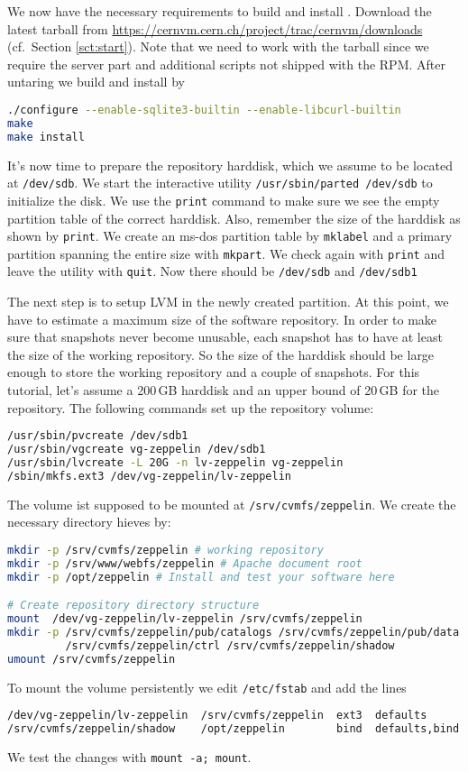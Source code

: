 We now have the necessary requirements to build and install \cvmfs.
Download the latest tarball from \url{https://cernvm.cern.ch/project/trac/cernvm/downloads} (cf.~Section \ref{sct:start}).
Note that we need to work with the tarball since we require the server part and additional scripts not shipped with the RPM.
After untaring we build and install by
\begin{lstlisting}[language=bash]
./configure --enable-sqlite3-builtin --enable-libcurl-builtin
make
make install
\end{lstlisting}

It's now time to prepare the repository harddisk, which we assume to be located at \texttt{/dev/sdb}.
We start the interactive utility \lstinline{/usr/sbin/parted /dev/sdb} to initialize the disk.
We use the \lstinline{print} command to make sure we see the empty partition table of the correct harddisk.
Also, remember the size of the harddisk as shown by \lstinline{print}.
We create an ms-dos partition table by \lstinline{mklabel} and a primary partition spanning the entire size with \lstinline{mkpart}.
We check again with \lstinline{print} and leave the utility with \lstinline{quit}.
Now there should be \texttt{/dev/sdb} and \texttt{/dev/sdb1}

The next step is to setup LVM in the newly created partition.
At this point, we have to estimate a maximum size of the software repository.
In order to make sure that snapshots never become unusable, each snapshot has to have at least the size of the working repository.
So the size of the harddisk should be large enough to store the working repository and a couple of snapshots.
For this tutorial, let's assume a 200\,GB harddisk and an upper bound of 20\,GB for the repository.
The following commands set up the repository volume:
\begin{lstlisting}[language=bash]
/usr/sbin/pvcreate /dev/sdb1
/usr/sbin/vgcreate vg-zeppelin /dev/sdb1
/usr/sbin/lvcreate -L 20G -n lv-zeppelin vg-zeppelin
/sbin/mkfs.ext3 /dev/vg-zeppelin/lv-zeppelin
\end{lstlisting}
The volume ist supposed to be mounted at \texttt{/srv/cvmfs/zeppelin}.
We create the necessary directory hieves by:
\begin{lstlisting}[language=bash]
mkdir -p /srv/cvmfs/zeppelin # working repository
mkdir -p /srv/www/webfs/zeppelin # Apache document root
mkdir -p /opt/zeppelin # Install and test your software here

# Create repository directory structure
mount  /dev/vg-zeppelin/lv-zeppelin /srv/cvmfs/zeppelin
mkdir -p /srv/cvmfs/zeppelin/pub/catalogs /srv/cvmfs/zeppelin/pub/data \
         /srv/cvmfs/zeppelin/ctrl /srv/cvmfs/zeppelin/shadow
umount /srv/cvmfs/zeppelin
\end{lstlisting}
To mount the volume persistently we edit \texttt{/etc/fstab} and add the lines
\begin{lstlisting}[language=bash]
/dev/vg-zeppelin/lv-zeppelin  /srv/cvmfs/zeppelin  ext3  defaults       0 0
/srv/cvmfs/zeppelin/shadow    /opt/zeppelin        bind  defaults,bind  0 0
\end{lstlisting}
We test the changes with \lstinline{mount -a; mount}.

